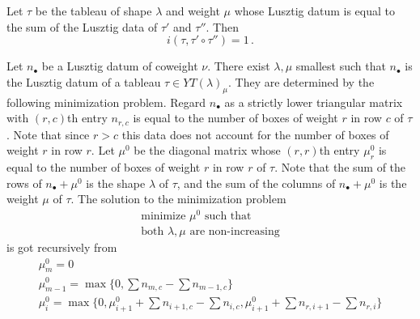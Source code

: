 \documentclass[draft]{article}
\begin{document}
% 
\begin{conjecture}
    Let $\tau$ be the tableau of shape $\lambda$ and weight $\mu$ whose Lusztig datum is equal to the sum of the Lusztig data of $\tau'$ and $\tau''$. 
    Then 
    \begin{equation}
        i(\tau, 
        \tau' \circ \tau''
        ) = 1 \,. 
    \end{equation}
\end{conjecture}
% 

\begin{lemma}
    \label{lem:mintab}
    Let $n_\bullet$ be a Lusztig datum of coweight $\nu$. There exist $\lambda,\mu$ smallest such that $n_\bullet$ is the Lusztig datum of a tableau $\tau\in YT(\lambda)_\mu$. They are determined by the following minimization problem. Regard $n_\bullet$ as a strictly lower triangular matrix with $(r,c)$th entry $n_{r,c}$ is equal to the number of boxes of weight $r$ in row $c$ of $\tau$. Note that since $r > c$ this data does not account for the number of boxes of weight $r$ in row $r$. Let $\mu^0$ be the diagonal matrix whose $(r,r)$th entry $\mu^0_r$ is equal to the number of boxes of weight $r$ in row $r$ of $\tau$. Note that the sum of the rows of $n_\bullet + \mu^0$ is the shape $\lambda$ of $\tau$, and the sum of the columns of $n_\bullet + \mu^0$ is the weight $\mu$ of $\tau$. The solution to the minimization problem 
    \[
        \begin{gathered}
        \text{minimize }\mu^0\text{ such that} \\
        \text{both }\lambda,\mu\text{ are non-increasing}
        \end{gathered} 
    \]
    is got recursively from %
    \[
        \begin{gathered}
            \mu^0_{m} = 0 \\ 
            \mu^0_{m-1} = \max\{0 , \sum n_{m,c} - \sum n_{m-1,c}\} \\ 
            \mu^0_i = \max\{0, \mu^0_{i+1} + \sum n_{i+1,c} - \sum n_{i,c} , \mu_{i+1}^0 + \sum n_{r,i+1} - \sum n_{r,i}\}

\end{gathered}\]
\end{lemma}
\end{document}

